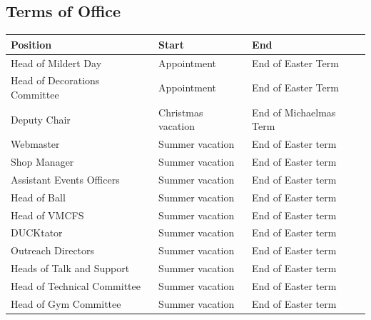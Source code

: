 \documentclass[12pt]{article}
\begin{document}
    \subsection{Terms of Office}
    \begin{longtable}{|l|l|l|}
        \hline
        \textbf{Position} & \textbf{Start} & \textbf{End}\\
        \hline\hline
        \endhead
        \hline
        \endfoot

        Head of Mildert Day & Appointment & End of Easter Term\\
        Head of Decorations Committee & Appointment & End of Easter Term\\
        Deputy Chair & Christmas vacation & End of Michaelmas Term\\
        Webmaster & Summer vacation & End of Easter term\\
        Shop Manager & Summer vacation & End of Easter term\\
        Assistant Events Officers & Summer vacation & End of Easter term\\
        Head of Ball & Summer vacation & End of Easter term\\
        Head of VMCFS & Summer vacation & End of Easter term\\
        DUCKtator & Summer vacation & End of Easter term\\
        Outreach Directors & Summer vacation & End of Easter term\\
        Heads of Talk and Support & Summer vacation & End of Easter term\\
        Head of Technical Committee & Summer vacation & End of Easter term\\
        Head of Gym Committee & Summer vacation & End of Easter term\\
    \end{longtable}
\end{document}
